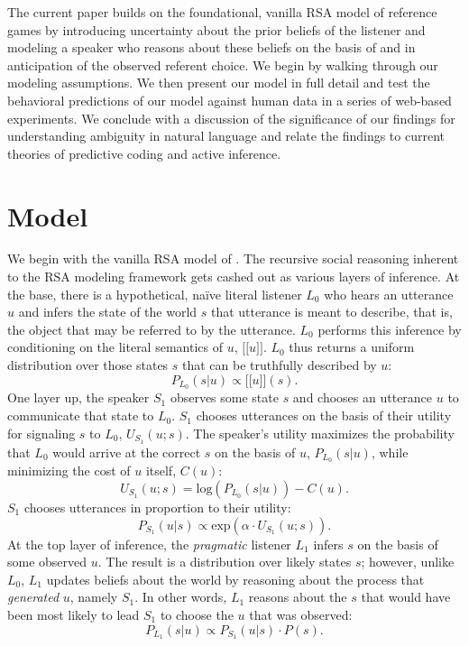 \documentclass[10pt,a4paper]{article}
\newcommand{\sem}[1]{\mbox{$[\![$#1$]\!]$}}
\begin{document}
The current paper builds on the foundational, vanilla RSA model of reference games by introducing uncertainty about the prior beliefs of the listener and modeling a speaker who reasons about these beliefs on the basis of and in anticipation of the observed referent choice. 
We begin by walking through our modeling assumptions. 
We then present our model in full detail and test the behavioral predictions of our model against human data in a series of web-based experiments.
We conclude with a discussion of the significance of our findings for understanding ambiguity in natural language and relate the findings to current theories of predictive coding and active inference.


\section{Model}

We begin with the vanilla RSA model of . The recursive social reasoning inherent to the RSA modeling framework gets cashed out as various layers of inference. At the base, there is a hypothetical, na\"ive literal listener $L_0$ who hears an utterance $u$ and infers the state of the world $s$ that utterance is meant to describe, that is, the object that may be referred to by the utterance. $L_0$ performs this inference by conditioning on the literal semantics of $u$, \sem{$u$}. $L_0$ thus returns a uniform distribution over those states $s$ that can be truthfully described by $u$:
$$P_{L_{0}}(s|u) \propto \sem{$u$}(s).$$
One layer up, the speaker $S_1$ observes some state $s$ and chooses an utterance $u$ to communicate that state to $L_0$. $S_1$ chooses utterances on the basis of their utility for signaling $s$ to $L_0$, $U_{S_1}(u;s)$. The speaker's utility maximizes the probability that $L_0$ would arrive at the correct $s$ on the basis of $u$, $P_{L_{0}}(s|u)$, while minimizing the cost of $u$ itself, $C(u)$:
$$U_{S_{1}}(u;s) = \textrm{log}(P_{L_{0}}(s|u)) - C(u).$$
$S_1$ chooses utterances in proportion to their utility:
$$P_{S_{1}} (u|s) \propto   \textrm{exp}(\alpha \cdot U_{S_{1}} (u;s)).$$
At the top layer of inference, the \emph{pragmatic} listener $L_1$ infers $s$ on the basis of some observed $u$. The result is a distribution over likely states $s$; however, unlike $L_0$, $L_1$ updates beliefs about the world by reasoning about the process that \emph{generated} $u$, namely $S_1$. In other words, $L_1$ reasons about the $s$ that would have been most likely to lead $S_1$ to choose the $u$ that was observed:
$$P_{L_{1}}(s|u) \propto P_{S_{1}}(u|s) \cdot P(s).$$
\end{document}

